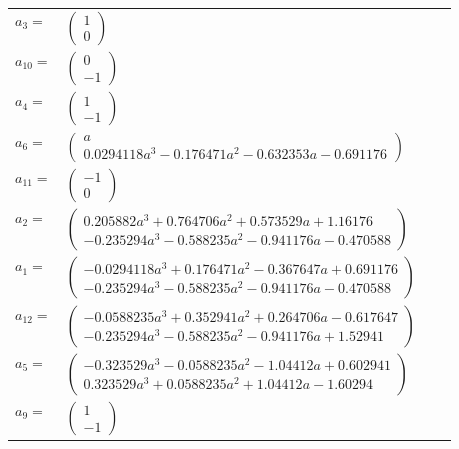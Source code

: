 \documentclass[1p]{elsarticle_modified}
\theoremstyle{definition}
\begin{document}
\begin{tabular}{m{7pt} m{180pt} m{7pt} m{180pt} }
\flushright $a_{3}=$&$\begin{pmatrix}1\\0\end{pmatrix}$ \\
\flushright $a_{10}=$&$\begin{pmatrix}0\\-1\end{pmatrix}$ \\
\flushright $a_{4}=$&$\begin{pmatrix}1\\-1\end{pmatrix}$ \\
\flushright $a_{6}=$&$\begin{pmatrix}a\\0.0294118 a^{3}-0.176471 a^{2}-0.632353 a-0.691176\end{pmatrix}$ \\
\flushright $a_{11}=$&$\begin{pmatrix}-1\\0\end{pmatrix}$ \\
\flushright $a_{2}=$&$\begin{pmatrix}0.205882 a^{3}+0.764706 a^{2}+0.573529 a+1.16176\\-0.235294 a^{3}-0.588235 a^{2}-0.941176 a-0.470588\end{pmatrix}$ \\
\flushright $a_{1}=$&$\begin{pmatrix}-0.0294118 a^{3}+0.176471 a^{2}-0.367647 a+0.691176\\-0.235294 a^{3}-0.588235 a^{2}-0.941176 a-0.470588\end{pmatrix}$ \\
\flushright $a_{12}=$&$\begin{pmatrix}-0.0588235 a^{3}+0.352941 a^{2}+0.264706 a-0.617647\\-0.235294 a^{3}-0.588235 a^{2}-0.941176 a+1.52941\end{pmatrix}$ \\
\flushright $a_{5}=$&$\begin{pmatrix}-0.323529 a^{3}-0.0588235 a^{2}-1.04412 a+0.602941\\0.323529 a^{3}+0.0588235 a^{2}+1.04412 a-1.60294\end{pmatrix}$ \\
\flushright $a_{9}=$&$\begin{pmatrix}1\\-1\end{pmatrix}$ \\

\end{tabular}
\end{document}
